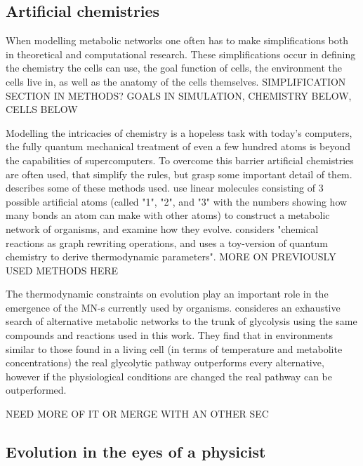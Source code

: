 \documentclass[10pt,a4paper]{article}
\begin{document}
	
	
	
	\subsection{Artificial chemistries}
	\label{sub:artificial_chemistries}


	When modelling metabolic networks one often has to make simplifications both in theoretical and computational research. These simplifications occur in defining the chemistry the cells can use, the goal function of cells, the environment the cells live in, as well as the anatomy of the cells themselves. SIMPLIFICATION SECTION IN METHODS? GOALS IN SIMULATION, CHEMISTRY BELOW, CELLS BELOW
	
	Modelling the intricacies of chemistry is a hopeless task with today's computers, the fully quantum mechanical treatment of even a few hundred atoms is beyond the capabilities of supercomputers. To overcome this barrier artificial chemistries are often used, that simplify the rules, but grasp some important detail of them. \cite{artificialreview} describes some of these methods used. \cite{evolutioncomplex} use linear molecules consisting of 3 possible  artificial atoms (called "1", "2", and "3" with the numbers showing how many bonds an atom can make with other atoms) to construct a metabolic network of organisms, and examine how they evolve. \cite{computationalframework} considers "chemical reactions as graph rewriting operations, and uses a toy-version of quantum chemistry to derive thermodynamic parameters". MORE ON PREVIOUSLY USED METHODS HERE
	
	The thermodynamic constraints on evolution play an important role in the emergence of the MN-s currently used by organisms. \cite{BartekLower} consideres an exhaustive search of alternative metabolic networks to the trunk of glycolysis using the same compounds and reactions used in this work. They find that in environments similar to those found in a living cell (in terms of temperature and metabolite concentrations) the real glycolytic pathway outperforms every alternative, however if the physiological conditions are changed the real pathway can be outperformed.

	NEED MORE OF IT OR MERGE WITH AN OTHER SEC

	
	\subsection{Evolution in the eyes of a physicist}\label{chap:whereisphysics}
\end{document}
